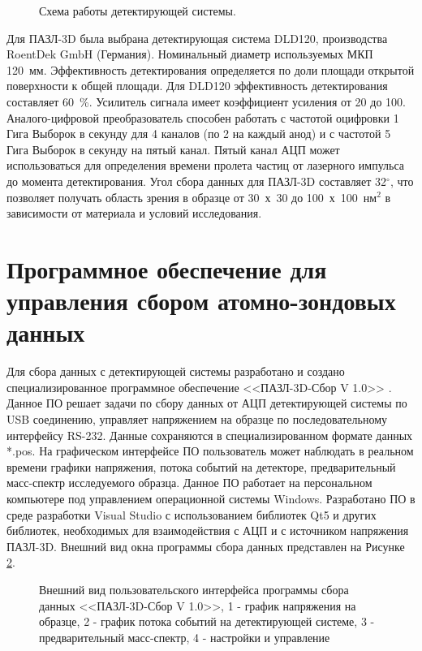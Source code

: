 \begin{figure}[htb]
	\caption{Схема работы детектирующей системы. }
	\label{fig:APPLE_detectionsystem}
\end{figure}

Для ПАЗЛ-3D была выбрана детектирующая система DLD120, производства RoentDek GmbH (Германия). Номинальный диаметр используемых МКП 120~мм. Эффективность детектирования определяется по доли площади открытой поверхности к общей площади. Для DLD120 эффективность детектирования составляет 60~\%. Усилитель сигнала имеет коэффициент усиления от 20 до 100. Аналого-цифровой преобразователь способен работать с частотой оцифровки 1 Гига Выборок в секунду для 4 каналов (по 2 на каждый анод) и с частотой 5 Гига Выборок в секунду на пятый канал. Пятый канал АЦП может использоваться для определения времени пролета частиц от лазерного импульса до момента детектирования. Угол сбора данных для ПАЗЛ-3D составляет 32$^{\circ}$, что позволяет получать область зрения в образце от 30~х~30 до 100~х~100~нм$^{2}$ в зависимости от материала и условий исследования.

\FloatBarrier

\section{Программное обеспечение для управления сбором атомно-зондовых данных}\label{sec:ch2/sec5}

Для сбора данных с детектирующей системы разработано и создано специализированное программное обеспечение <<ПАЗЛ-3D-Сбор V 1.0>> \cite{SBOR}. Данное ПО решает задачи по сбору данных от АЦП детектирующей системы по USB соединению, управляет напряжением на образце по последовательному интерфейсу RS-232. Данные сохраняются в специализированном формате данных *.pos. На графическом интерфейсе ПО пользователь может наблюдать в реальном времени графики напряжения, потока событий на детекторе, предварительный масс-спектр исследуемого образца. Данное ПО работает на персональном компьютере под управлением операционной системы Windows. Разработано ПО в среде разработки Visual Studio с использованием библиотек Qt5 и других библиотек, необходимых для взаимодействия с АЦП и с источником напряжения ПАЗЛ-3D. Внешний вид окна программы сбора данных представлен на Рисунке \cref{fig:APPLE_sbor}.

\begin{figure}[htb]
	\caption{Внешний вид пользовательского интерфейса программы сбора данных  <<ПАЗЛ-3D-Сбор V 1.0>>, 1 - график напряжения на образце, 2 - график потока событий на детектирующей системе, 3 - предварительный масс-спектр, 4 - настройки и управление}
	\label{fig:APPLE_sbor}
\end{figure}

